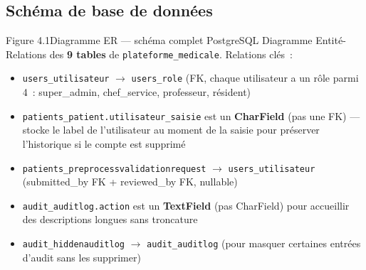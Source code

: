 \documentclass[12pt,a4paper]{article}
\begin{document}
\subsection{Schéma de base de données}

\begin{figbox}{Figure 4.1}{Diagramme ER --- schéma complet PostgreSQL}
Diagramme Entité-Relations des \textbf{9 tables} de \texttt{plateforme\_medicale}.
Relations clés~:
\begin{itemize}[leftmargin=1.5em, itemsep=2pt]
  \item \texttt{users\_utilisateur} $\rightarrow$ \texttt{users\_role} (FK,
    chaque utilisateur a un rôle parmi 4~: super\_admin, chef\_service,
    professeur, résident)
  \item \texttt{patients\_patient.utilisateur\_saisie} est un \textbf{CharField}
    (pas une FK) --- stocke le label de l'utilisateur au moment de la saisie
    pour préserver l'historique si le compte est supprimé
  \item \texttt{patients\_preprocessvalidationrequest} $\rightarrow$
    \texttt{users\_utilisateur} (submitted\_by FK + reviewed\_by FK, nullable)
  \item \texttt{audit\_auditlog.action} est un \textbf{TextField} (pas CharField)
    pour accueillir des descriptions longues sans troncature
  \item \texttt{audit\_hiddenauditlog} $\rightarrow$ \texttt{audit\_auditlog}
    (pour masquer certaines entrées d'audit sans les supprimer)
\end{itemize}
\end{figbox}
\end{document}
